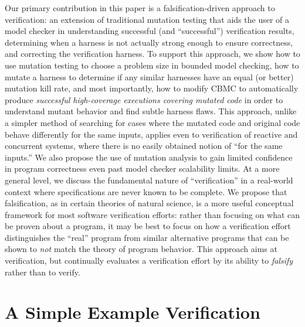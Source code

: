 \documentclass[conference]{IEEEtran}
\begin{document}
Our primary contribution in this paper is a falsification-driven
approach to verification: an extension of traditional mutation testing
that aids the user of a model checker in understanding successful (and
``successful'') verification results, determining when a harness is
not actually strong enough to ensure correctness, and correcting the
verification harness.  To support this approach, we show how to use
mutation testing to choose a problem size in bounded model checking, how to
mutate a harness to determine if any similar harnesses have an equal
(or better) mutation kill rate, and most importantly, how to modify
CBMC to automatically produce \emph{successful high-coverage
  executions covering mutated code} in order to understand mutant
behavior and find subtle harness flaws.  This approach, unlike a
simpler method of searching for cases where the mutated code and
original code behave differently for the same inputs, applies even to verification of
reactive and concurrent systems, where there is no easily obtained
notion of ``for the same inputs.''  We also propose the use of
mutation analysis to gain limited confidence in program correctness
even past model checker scalability limits. At a more general level,
we discuss the fundamental nature of ``verification'' in a real-world
context where specifications are never known to be complete. We
propose that falsification, as in certain theories of natural science,
is a more useful conceptual framework for most software verification
efforts: rather than focusing on what can be proven about a program,
it may be best to focus on how a verification effort distinguishes the
``real'' program from similar alternative programs that can be shown
to \emph{not} match the theory of program behavior.  This approach
aims at verification, but continually evaluates a verification effort
by its ability to \emph{falsify} rather than to verify.

\section{A Simple Example Verification}
\end{document}
